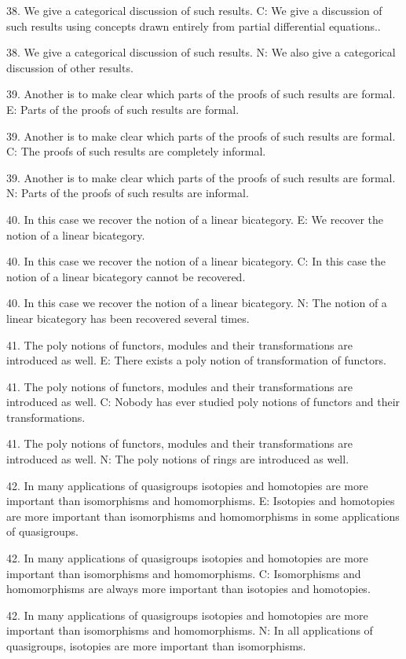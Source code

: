 38. We give a categorical discussion of such results.
C:  We  give a discussion of such results using concepts drawn entirely from partial differential equations..

38. We give a categorical discussion of such results.
N:  We also give a categorical discussion of other results.

39. Another is to make clear which parts of the proofs of such results are formal.
E:   Parts of the proofs of such results are formal.

39. Another is to make clear which parts of the proofs of such results are formal.
C:   The proofs of such results are completely informal.

39. Another is to make clear which parts of the proofs of such results are formal.
N:   Parts of the proofs of such results are informal.

40. In this case we recover the notion of a linear bicategory.
E:   We recover the notion of a linear bicategory.

40. In this case we recover the notion of a linear bicategory.
C:   In this case the notion of a linear bicategory cannot be recovered.

40. In this case we recover the notion of a linear bicategory.
N:   The notion of a linear bicategory has been recovered several times.

41. The poly notions of functors, modules and their transformations are introduced as well.
E: There exists a poly notion of transformation of functors.

41. The poly notions of functors, modules and their transformations are introduced as well.
C: Nobody has ever studied poly notions of functors and their transformations.

41. The poly notions of functors, modules and their transformations are introduced as well.
N: The poly notions of rings are introduced as well.

42. In many applications of quasigroups isotopies and homotopies are more important than isomorphisms and homomorphisms.
E: Isotopies and homotopies are more important than isomorphisms and homomorphisms in some applications of quasigroups.

42. In many applications of quasigroups isotopies and homotopies are more important than isomorphisms and homomorphisms.
C: Isomorphisms and homomorphisms are always more important than isotopies and homotopies.

42. In many applications of quasigroups isotopies and homotopies are more important than isomorphisms and homomorphisms.
N: In all applications of quasigroups, isotopies are more important than isomorphisms.

